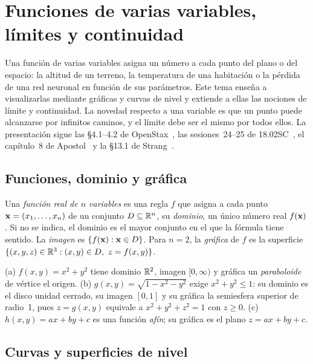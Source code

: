 \chapter{Funciones de varias variables, límites y continuidad}
\label{tema:3}

Una función de varias variables asigna un número a cada punto del plano o del espacio: la altitud de un terreno, la temperatura de una habitación o la pérdida de una red neuronal en función de sus parámetros. Este tema enseña a visualizarlas mediante gráficas y curvas de nivel y extiende a ellas las nociones de límite y continuidad. La novedad respecto a una variable es que un punto puede alcanzarse por infinitos caminos, y el límite debe ser el mismo por todos ellos. La presentación sigue las §4.1--4.2 de OpenStax~\cite{openstax3}, las sesiones~24--25 de 18.02SC~\cite{mit1802}, el capítulo~8 de Apostol~\cite{apostol2} y la §13.1 de Strang~\cite{strangcalc}.

\section{Funciones, dominio y gráfica}

\begin{definicion}\label{def:funcion-n}
Una \emph{función real de $n$ variables} es una regla $f$ que asigna a cada punto $\mathbf{x}=(x_1,\dots,x_n)$ de un conjunto $D\subseteq\mathbb{R}^n$, su \emph{dominio}, un único número real $f(\mathbf{x})$. Si no se indica, el dominio es el mayor conjunto en el que la fórmula tiene sentido. La \emph{imagen} es $\{f(\mathbf{x}):\mathbf{x}\in D\}$. Para $n=2$, la \emph{gráfica} de $f$ es la superficie $\{(x,y,z)\in\mathbb{R}^3: (x,y)\in D,\ z=f(x,y)\}$.
\end{definicion}

\begin{ejemplo}\label{ej:t3-graficas}
(a) $f(x,y)=x^2+y^2$ tiene dominio $\mathbb{R}^2$, imagen $[0,\infty)$ y gráfica un \emph{paraboloide} de vértice el origen. (b) $g(x,y)=\sqrt{1-x^2-y^2}$ exige $x^2+y^2\le1$: su dominio es el disco unidad cerrado, su imagen $[0,1]$ y su gráfica la semiesfera superior de radio~1, pues $z=g(x,y)$ equivale a $x^2+y^2+z^2=1$ con $z\ge0$. (c) $h(x,y)=ax+by+c$ es una función \emph{afín}; su gráfica es el plano $z=ax+by+c$.
\end{ejemplo}

\section{Curvas y superficies de nivel}

